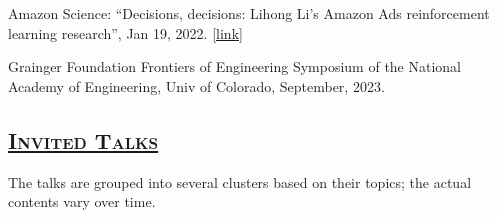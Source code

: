 \documentclass[10pt,twoside,letterpaper]{article}
\begin{document}
\begin{compactitem}
\begin{compactitem}
\item{Amazon Science: ``Decisions, decisions: Lihong Li's Amazon Ads reinforcement learning research'', Jan 19, 2022. \href{https://www.amazon.science/working-at-amazon/amazon-advertising-lihong-li-using-reinforcement-learning-algorithms}{[link]}}

\item{Grainger Foundation Frontiers of Engineering Symposium of the National Academy of Engineering, Univ of Colorado, September, 2023.}

\end{compactitem}

\end{compactitem}

\subsection*{\textsc{\underline{Invited Talks}}}

The talks are grouped into several clusters based on their topics; the actual contents vary over time.
\end{document}
